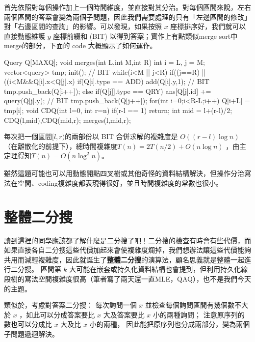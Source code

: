 首先依照對每個操作加上一個時間維度，並直接對其分治。對每個區間來說，左右兩個區間的答案會變為兩個子問題，因此我們需要處理的只有「左邊區間的修改」對「右邊區間的查詢」的影響。可以發現，如果按照 $x$ 座標排序好，我們就可以直接動態維護 $y$ 座標前綴和 (BIT) 以得到答案；實作上有點類似merge sort中merge的部分，下面的 code 大概顯示了如何運作。

\begin{C++}
Query Q[MAXQ];
void merges(int L,int M,int R){
	int i = L, j = M;
	vector<query> tmp;
	init(); // BIT
	while(i<M || j<R){
		if((j==R) || ((i<M&&Q[i].x<Q[j].x){
			if(Q[i].type == ADD)
				add(Q[i].y,1); // BIT
			tmp.push_back(Q[i++]);	
		}else{
			if(Q[j]].type == QRY)
				ans[Q[j].id] += query(Q[j].y); // BIT
			tmp.push_back(Q[j++]);
		}
	}
	for(int i=0;i<R-L;i++)
		Q[i+L] = tmp[i];
}
void CDQ(int l=0, int r=n){
	if(r-l == 1) return;
	int mid = l+(r-l)/2;
	CDQ(l,mid),CDQ(mid,r);
	merges(l,mid,r);
}
\end{C++}

每次把一個區間$[l,r)$的兩部份以 BIT 合併求解的複雜度是 $O((r-l)\log n)$ （在離散化的前提下），總時間複雜度$T(n)=2T(n/2)+O(n\log n)$ ，由主定理得知$T(n)=O(n\log^2n)$。

雖然這題可能也可以用動態開點四叉樹或其他奇怪的資料結構解決，但操作分治寫法在空間、coding複雜度都表現得很好，並且時間複雜度的常數也很小。

\section{整體二分搜}
讀到這裡的同學應該都了解什麼是二分搜了吧！二分搜的檢查有時會有些代價，而如果直接各自二分搜這些代價加起來會使複雜度爛掉，我們想辦法讓這些代價能夠共用而減輕複雜度，因此就誕生了\textbf{整體二分搜}的演算法，顧名思義就是整體一起進行二分搜。
區間第 $k$ 大可能在嵌套或持久化資料結構也會提到，但利用持久化線段樹的寫法空間複雜度很高（筆者寫了兩天還一直MLE，QAQ），也不是我們今天的主題。

類似於，考慮對答案二分搜：
每次詢問一個 $x$ 並檢查每個詢問區間有幾個數不大於 $x$ ，如此可以分成答案要比 $x$ 大及答案要比 $x$ 小的兩種詢問；
注意原序列的數也可以分成比 $x$ 大及比 $x$ 小的兩種，
因此能把原序列也分成兩部分，變為兩個子問題遞迴解決。

